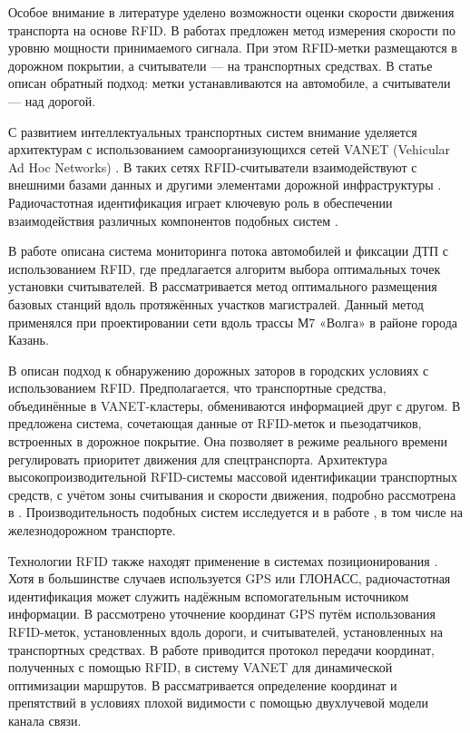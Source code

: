 \documentclass[12pt]{article}
\theoremstyle{definition}
\begin{document}
Особое внимание в литературе уделено возможности оценки скорости движения транспорта на основе RFID. В работах \cite{Zhai2018, Jing2013} предложен метод измерения скорости по уровню мощности принимаемого сигнала. При этом RFID-метки размещаются в дорожном покрытии, а считыватели — на транспортных средствах. В статье \cite{Choy2020} описан обратный подход: метки устанавливаются на автомобиле, а считыватели — над дорогой.

С развитием интеллектуальных транспортных систем внимание уделяется архитектурам с использованием самоорганизующихся сетей VANET (Vehicular Ad Hoc Networks) \cite{Al-Shareeda2023, Vishn2016_2}. В таких сетях RFID-считыватели взаимодействуют с внешними базами данных и другими элементами дорожной инфраструктуры \cite{Vishn2016, F.Zhu2020}. Радиочастотная идентификация играет ключевую роль в обеспечении взаимодействия различных компонентов подобных систем \cite{Zhang2018, Zhang2019, Shirabur2020, Pawowicz2020, Vishn2013, Vishnevsky2022, Larionov2017, Larionov2018, Vishnevsky2012}.

В работе \cite{Zhang2018} описана система мониторинга потока автомобилей и фиксации ДТП с использованием RFID, где предлагается алгоритм выбора оптимальных точек установки считывателей. В \cite{Amir2022, Vishn2016, Vishn228} рассматривается метод оптимального размещения базовых станций вдоль протяжённых участков магистралей. Данный метод применялся при проектировании сети вдоль трассы М7 «Волга» в районе города Казань.

В \cite{Zhang2019} описан подход к обнаружению дорожных заторов в городских условиях с использованием RFID. Предполагается, что транспортные средства, объединённые в VANET-кластеры, обмениваются информацией друг с другом. В \cite{Shirabur2020} предложена система, сочетающая данные от RFID-меток и пьезодатчиков, встроенных в дорожное покрытие. Она позволяет в режиме реального времени регулировать приоритет движения для спецтранспорта. Архитектура высокопроизводительной RFID-системы массовой идентификации транспортных средств, с учётом зоны считывания и скорости движения, подробно рассмотрена в \cite{Pawowicz2020}. Производительность подобных систем исследуется и в работе \cite{Unterhuber2020}, в том числе на железнодорожном транспорте.

Технологии RFID также находят применение в системах позиционирования \cite{Zhang2025, Ajroud2025, Yang2024}. Хотя в большинстве случаев используется GPS или ГЛОНАСС, радиочастотная идентификация может служить надёжным вспомогательным источником информации. В \cite{Zheng2018} рассмотрено уточнение координат GPS путём использования RFID-меток, установленных вдоль дороги, и считывателей, установленных на транспортных средствах. В работе \cite{Lu2021} приводится протокол передачи координат, полученных с помощью RFID, в систему VANET для динамической оптимизации маршрутов. В \cite{Garcia2018} рассматривается определение координат и препятствий в условиях плохой видимости с помощью двухлучевой модели канала связи.
\end{document}
